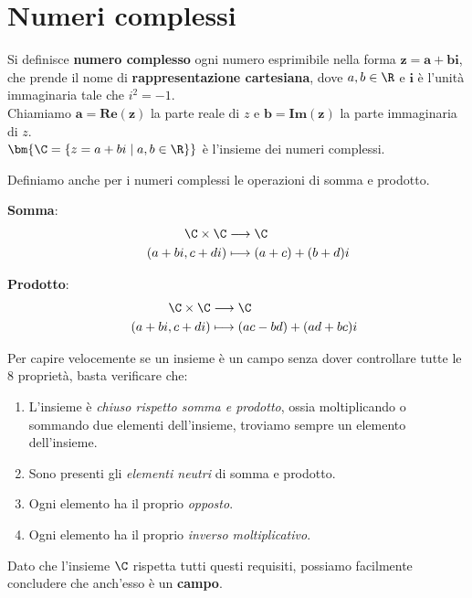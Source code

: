 \documentclass[11pt, a4paper, titlepage, oneside]{scrbook}
\begin{document}
\section{Numeri complessi}
\begin{Definizione}
\label{def-num-comp}
Si definisce \textbf{numero complesso} ogni numero esprimibile nella forma $\bm{z = a + bi}$, che prende il nome di \textbf{rappresentazione cartesiana}, dove $a,b \in \R$ e $\bm{i}$ è l'unità immaginaria tale che $i^2 = -1$. \\
Chiamiamo $\bm{a = Re(z)}$ la parte reale di $z$ e $\bm{b = Im(z)}$ la parte immaginaria di $z$. \\
$\bm{\C = \{z = a + bi \mid a,b \in \R\}}$ è l'insieme dei numeri complessi.
\end{Definizione}

Definiamo anche per i numeri complessi le operazioni di somma e prodotto.

\bigskip

\begin{minipage}[c]{0.45\textwidth}
    \centering
    {\hspace{-0.2cm}\Large\textbf{Somma}:}
    \begin{align*}
        \hspace{0.6cm} \C \times \C &\longrightarrow \C \\
        \hspace{0.6cm} (a + bi, c + di) &\longmapsto (a + c) + (b + d)i
    \end{align*}
\end{minipage}
\begin{minipage}[c]{0.45\textwidth}
    \centering
    {\hspace{-1.2cm}\Large\textbf{Prodotto}:}
    \begin{align*}
        \hspace{0.4cm} \C \times \C &\longrightarrow \C \\
        \hspace{0.4cm} (a + bi, c + di) &\longmapsto (ac - bd) + (ad + bc)i
    \end{align*}
\end{minipage}

\bigskip

Per capire velocemente se un insieme è un campo senza dover controllare tutte le 8 proprietà, basta verificare che:
\begin{enumerate}[label = \arabic*°]
    \item L'insieme è \textit{chiuso rispetto somma e prodotto}, ossia moltiplicando o sommando due elementi dell'insieme, troviamo sempre un elemento dell'insieme.
    \item Sono presenti gli \textit{elementi neutri} di somma e prodotto.
    \item Ogni elemento ha il proprio \textit{opposto}.
    \item Ogni elemento ha il proprio \textit{inverso moltiplicativo}.
\end{enumerate}
Dato che l'insieme $\C$ rispetta tutti questi requisiti, possiamo facilmente concludere che anch'esso è un \textbf{campo}.
\end{document}
